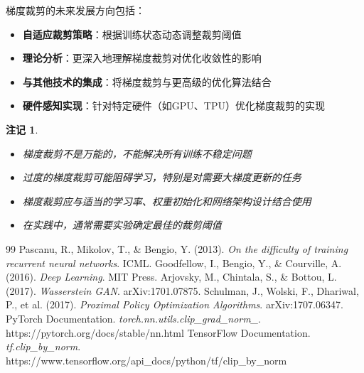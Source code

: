 \documentclass{article}
\newtheorem{remark}{注记}[section]
\begin{document}
梯度裁剪的未来发展方向包括：
\begin{itemize}
    \item \textbf{自适应裁剪策略}：根据训练状态动态调整裁剪阈值
    \item \textbf{理论分析}：更深入地理解梯度裁剪对优化收敛性的影响
    \item \textbf{与其他技术的集成}：将梯度裁剪与更高级的优化算法结合
    \item \textbf{硬件感知实现}：针对特定硬件（如GPU、TPU）优化梯度裁剪的实现
\end{itemize}

\begin{remark}
\begin{itemize}
    \item 梯度裁剪不是万能的，不能解决所有训练不稳定问题
    \item 过度的梯度裁剪可能阻碍学习，特别是对需要大梯度更新的任务
    \item 梯度裁剪应与适当的学习率、权重初始化和网络架构设计结合使用
    \item 在实践中，通常需要实验确定最佳的裁剪阈值
\end{itemize}
\end{remark}

\begin{thebibliography}{99}
 Pascanu, R., Mikolov, T., \& Bengio, Y. (2013). \textit{On the difficulty of training recurrent neural networks}. ICML.
 Goodfellow, I., Bengio, Y., \& Courville, A. (2016). \textit{Deep Learning}. MIT Press.
 Arjovsky, M., Chintala, S., \& Bottou, L. (2017). \textit{Wasserstein GAN}. arXiv:1701.07875.
 Schulman, J., Wolski, F., Dhariwal, P., et al. (2017). \textit{Proximal Policy Optimization Algorithms}. arXiv:1707.06347.
 PyTorch Documentation. \textit{torch.nn.utils.clip\_grad\_norm\_}. https://pytorch.org/docs/stable/nn.html
 TensorFlow Documentation. \textit{tf.clip\_by\_norm}. https://www.tensorflow.org/api_docs/python/tf/clip_by_norm
\end{thebibliography}
\end{document}
